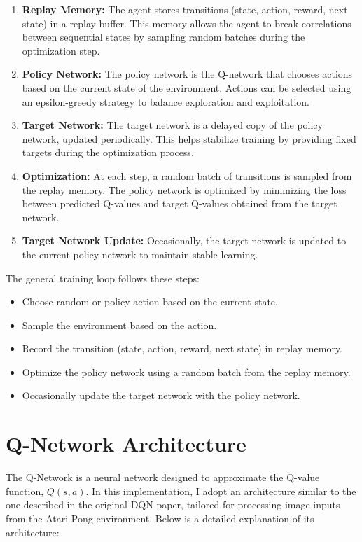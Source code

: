 \documentclass[
12pt, %
oneside, %
english, %
onehalfspacing, %
nolistspacing, %
liststotoc, %
headsepline, %
]{ProposalAndThesis} %
\begin{document}
\begin{enumerate}
    \item \textbf{Replay Memory:} The agent stores transitions (state, action, reward, next state) in a replay buffer. This memory allows the agent to break correlations between sequential states by sampling random batches during the optimization step.
    \item \textbf{Policy Network:} The policy network is the Q-network that chooses actions based on the current state of the environment. Actions can be selected using an epsilon-greedy strategy to balance exploration and exploitation.
    \item \textbf{Target Network:} The target network is a delayed copy of the policy network, updated periodically. This helps stabilize training by providing fixed targets during the optimization process.
    \item \textbf{Optimization:} At each step, a random batch of transitions is sampled from the replay memory. The policy network is optimized by minimizing the loss between predicted Q-values and target Q-values obtained from the target network.
    \item \textbf{Target Network Update:} Occasionally, the target network is updated to the current policy network to maintain stable learning.
\end{enumerate}

The general training loop follows these steps:
\begin{itemize}
    \item Choose random or policy action based on the current state.
    \item Sample the environment based on the action.
    \item Record the transition (state, action, reward, next state) in replay memory.
    \item Optimize the policy network using a random batch from the replay memory.
    \item Occasionally update the target network with the policy network.
\end{itemize}

\chapter{Q-Network Architecture}
The Q-Network is a neural network designed to approximate the Q-value function, \( Q(s, a) \). In this implementation, I adopt an architecture similar to the one described in the original DQN paper, tailored for processing image inputs from the Atari Pong environment. Below is a detailed explanation of its architecture:
\end{document}
